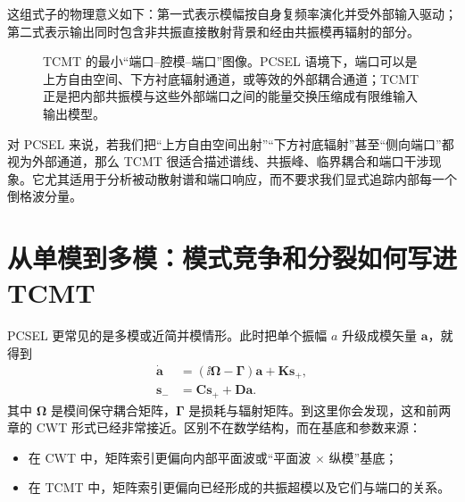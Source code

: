 这组式子的物理意义如下：第一式表示模幅按自身复频率演化并受外部输入驱动；第二式表示输出同时包含非共振直接散射背景和经由共振模再辐射的部分。

\begin{figure}[htbp]
  \centering
  \caption{TCMT 的最小“端口--腔模--端口”图像。PCSEL 语境下，端口可以是上方自由空间、下方衬底辐射通道，或等效的外部耦合通道；TCMT 正是把内部共振模与这些外部端口之间的能量交换压缩成有限维输入输出模型。}
  \label{fig:tcmt_port_cavity}
\end{figure}

对 PCSEL 来说，若我们把“上方自由空间出射”“下方衬底辐射”甚至“侧向端口”都视为外部通道，那么 TCMT 很适合描述谱线、共振峰、临界耦合和端口干涉现象。它尤其适用于分析被动散射谱和端口响应，而不要求我们显式追踪内部每一个倒格波分量。

\section{从单模到多模：模式竞争和分裂如何写进 TCMT}
PCSEL 更常见的是多模或近简并模情形。此时把单个振幅 $a$ 升级成模矢量 $\bm{a}$，就得到
\begin{align}
\dot{\bm{a}}
&=
\left(\ii\bm{\Omega}-\bm{\Gamma}\right)\bm{a}
+
\mathbf{K}\bm{s}_+,
\label{eq:tcmt_multi_a}\\
\bm{s}_-
&=
\mathbf{C}\bm{s}_+ + \mathbf{D}\bm{a}.
\label{eq:tcmt_multi_s}
\end{align}
其中 $\bm{\Omega}$ 是模间保守耦合矩阵，$\bm{\Gamma}$ 是损耗与辐射矩阵。到这里你会发现，这和前两章的 CWT 形式已经非常接近。区别不在数学结构，而在基底和参数来源：
\begin{itemize}
  \item 在 CWT 中，矩阵索引更偏向内部平面波或“平面波 $\times$ 纵模”基底；
  \item 在 TCMT 中，矩阵索引更偏向已经形成的共振超模以及它们与端口的关系。
\end{itemize}

